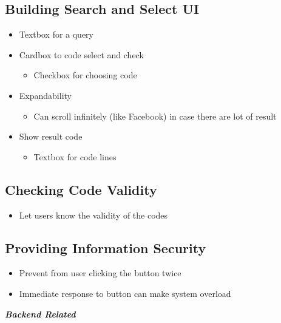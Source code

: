 \documentclass[conference]{IEEEtran}
\begin{document}
\subsection{Building Search and Select UI}
\begin{itemize}
  \item Textbox for a query
  \item Cardbox to code select and check
  \begin{itemize}
    \item Checkbox for choosing code
  \end{itemize}
  \item Expandability
  \begin{itemize}
    \item Can scroll infinitely (like Facebook) in case there are lot of result
  \end{itemize}
  \item Show result code
  \begin{itemize}
    \item Textbox for code lines
  \end{itemize}
\end{itemize}
\textit{ }

\subsection{Checking Code Validity}
\begin{itemize}
  \item Let users know the validity of the codes
\end{itemize}
\textit{ }

\subsection{Providing Information Security}
\begin{itemize}
  \item Prevent from user clicking the button twice
  \item Immediate response to button can make system overload
\end{itemize}
\textit{ }


\textit{\textbf{Backend Related}}
\textit{ }
\end{document}
